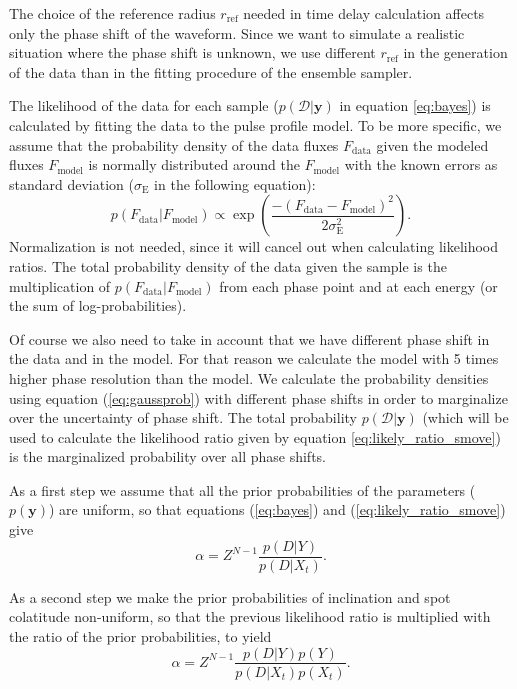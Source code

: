 \documentclass{wihuri}
\def\be{\begin{equation}}
\def\ee{\end{equation}}
\begin{document}
The choice of the reference radius $r_{\mathrm{ref}}$ needed in time delay calculation affects only the phase shift of the waveform. Since we want to simulate a realistic situation where the phase shift is unknown, we use different $r_{\mathrm{ref}}$ in the generation of the data than in the fitting procedure of the ensemble sampler.  

The likelihood of the data for each sample ($p(\mathcal{D}|\textbf{y})$ in equation \ref{eq:bayes}) is calculated by fitting the data to the pulse profile model. To be more specific, we assume that the probability density of the data fluxes $F_{\mathrm{data}}$ given the modeled fluxes $F_{\mathrm{model}}$  is normally distributed around the $F_{\mathrm{model}}$ with the known errors as standard deviation ($\sigma_{\mathrm{E}}$ in the following equation): 
\be \label{eq:gaussprob}
p(F_{\mathrm{data}}|F_{\mathrm{model}}) \propto \exp (\frac{-(F_{\mathrm{data}}-F_{\mathrm{model}})^{2}}{2\sigma_{\mathrm{E}}^{2}}).
\ee
Normalization is not needed, since it will cancel out when calculating likelihood ratios. The total probability density of the data given the sample is the multiplication of $p(F_{\mathrm{data}}|F_{\mathrm{model}})$ from each phase point and at each energy (or the sum of log-probabilities). 

Of course we also need to take in account that we have different phase shift in the data and in the model. For that reason we calculate the model with 5 times higher phase resolution than the model. We calculate the probability densities using equation (\ref{eq:gaussprob}) with different phase shifts in order to marginalize over the uncertainty of phase shift. %
The total probability $p(\mathcal{D}|\textbf{y})$ (which will be used to calculate the likelihood ratio given by equation \ref{eq:likely_ratio_smove}) is the marginalized probability over all phase shifts. 

As a first step we assume that all the prior probabilities of the parameters ($p(\textbf{y})$) are uniform, so that equations (\ref{eq:bayes}) and (\ref{eq:likely_ratio_smove}) give 
\be \label{eq:alpha1}
\alpha = Z^{N-1}\frac{p(D|Y)}{p(D|X_{t})}.
\ee

As a second step we make the prior probabilities of inclination and spot colatitude non-uniform, so that the previous likelihood ratio is multiplied with the ratio of the prior probabilities, to yield
\be \label{eq:alpha2}
\alpha = Z^{N-1}\frac{p(D|Y)p(Y)}{p(D|X_{t})p(X_{t})}.
\ee
\end{document}
